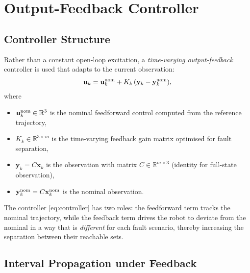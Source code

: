 \documentclass[11pt]{article}
\newcommand{\xvec}{\mathbf{x}}
\newcommand{\uvec}{\mathbf{u}}
\newcommand{\yvec}{\mathbf{y}}
\newcommand{\R}{\mathbb{R}}
\begin{document}
\section{Output-Feedback Controller}

\subsection{Controller Structure}

Rather than a constant open-loop excitation, a \emph{time-varying output-feedback}
controller is used that adapts to the current observation:
\begin{equation}
  \label{eq:controller}
  \uvec_k = \uvec_k^{\rm nom} + K_k\,(\yvec_k - \yvec_k^{\rm nom}),
\end{equation}
where
\begin{itemize}
  \item $\uvec_k^{\rm nom} \in \R^3$ is the nominal feedforward control computed
        from the reference trajectory,
  \item $K_k \in \R^{3\times m}$ is the time-varying feedback gain matrix
        optimised for fault separation,
  \item $\yvec_k = C\xvec_k$ is the observation with matrix $C \in \R^{m\times 3}$
        (identity for full-state observation),
  \item $\yvec_k^{\rm nom} = C\xvec_k^{\rm nom}$ is the nominal observation.
\end{itemize}

The controller \eqref{eq:controller} has two roles: the feedforward term tracks
the nominal trajectory, while the feedback term drives the robot to deviate
from the nominal in a way that is \emph{different} for each fault scenario,
thereby increasing the separation between their reachable sets.

\subsection{Interval Propagation under Feedback}
\end{document}

